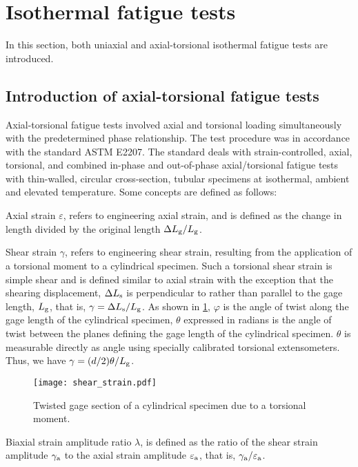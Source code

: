 \section{Isothermal fatigue tests}
\noindent
In this section, both uniaxial and axial-torsional isothermal fatigue tests are introduced.
\subsection{Introduction of axial-torsional fatigue tests}
\noindent
Axial-torsional fatigue tests involved axial and torsional loading simultaneously with the predetermined phase relationship.
The test procedure was in accordance with the standard ASTM E2207.
The standard deals with strain-controlled, axial, torsional, and combined in-phase and out-of-phase axial/torsional fatigue tests with thin-walled, circular cross-section, tubular specimens at isothermal, ambient and elevated temperature.
Some concepts are defined as follows:

Axial strain $\varepsilon$, refers to engineering axial strain, and is defined as the change in length divided by the original length $\Delta L_{\rm{g}}/L_{\rm{g}}$.

Shear strain $\gamma$, refers to engineering shear strain, resulting from the application of a torsional moment to a cylindrical specimen.
Such a torsional shear strain is simple shear and is defined similar to axial strain with the exception that the shearing displacement, $\Delta L_{\rm{s}}$ is perpendicular to rather than parallel to the gage length, $L_{\rm{g}}$, that is, $\gamma=\Delta L_{\rm{s}}/L_{\rm{g}}$.
As shown in \ref{Fig:Shear_Strain}, $\varphi$ is the angle of twist along the gage length of the cylindrical specimen, $\theta$ expressed in radians is the angle of twist between the planes defining the gage length of the cylindrical specimen.
$\theta$ is measurable directly as angle using specially calibrated torsional extensometers.
Thus, we have $\gamma = (d/2)\theta/ L_{\rm{g}}$.

\begin{figure}[!htp]
  \centering
  \texttt{[image: shear\_strain.pdf]}
  \caption{Twisted gage section of a cylindrical specimen due to a torsional moment.}
  \label{Fig:Shear_Strain}
\end{figure}

Biaxial strain amplitude ratio $\lambda$, is defined as the ratio of the shear strain amplitude $\gamma_{\rm{a}}$ to the axial strain amplitude $\varepsilon_{\rm{a}}$, that is, $\gamma_{\rm{a}}/\varepsilon_{\rm{a}}$.

